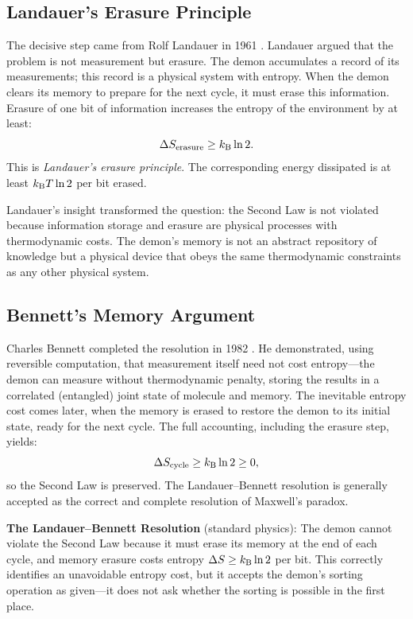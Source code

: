\subsection{Landauer's Erasure Principle}

The decisive step came from Rolf Landauer in 1961 \citep{landauer1961}. Landauer
argued that the problem is not measurement but erasure. The demon accumulates
a record of its measurements; this record is a physical system with entropy.
When the demon clears its memory to prepare for the next cycle, it must erase
this information. Erasure of one bit of information increases the entropy of
the environment by at least:
\begin{equation}
  \Delta S_{\mathrm{erasure}} \geq k_{\mathrm{B}} \ln 2.
  \label{eq:landauer_erasure}
\end{equation}
This is \emph{Landauer's erasure principle}. The corresponding energy dissipated
is at least $k_{\mathrm{B}} T \ln 2$ per bit erased.

Landauer's insight transformed the question: the Second Law is not violated
because information storage and erasure are physical processes with thermodynamic
costs. The demon's memory is not an abstract repository of knowledge but a
physical device that obeys the same thermodynamic constraints as any other
physical system.

\subsection{Bennett's Memory Argument}

Charles Bennett completed the resolution in 1982 \citep{bennett1982}. He
demonstrated, using reversible computation, that measurement itself need not
cost entropy---the demon can measure without thermodynamic penalty, storing the
results in a correlated (entangled) joint state of molecule and memory. The
inevitable entropy cost comes later, when the memory is erased to restore the
demon to its initial state, ready for the next cycle. The full accounting,
including the erasure step, yields:
\begin{equation}
  \Delta S_{\mathrm{cycle}} \geq k_{\mathrm{B}} \ln 2 \geq 0,
  \label{eq:bennett_cycle}
\end{equation}
so the Second Law is preserved. The Landauer--Bennett resolution is generally
accepted as the correct and complete resolution of Maxwell's paradox.

\begin{keyresult}
\textbf{The Landauer--Bennett Resolution} (standard physics): The demon cannot
violate the Second Law because it must erase its memory at the end of each
cycle, and memory erasure costs entropy $\Delta S \geq k_{\mathrm{B}} \ln 2$ per bit.
This correctly identifies an unavoidable entropy cost, but it accepts the
demon's sorting operation as given---it does not ask whether the sorting is
possible in the first place.
\end{keyresult}


